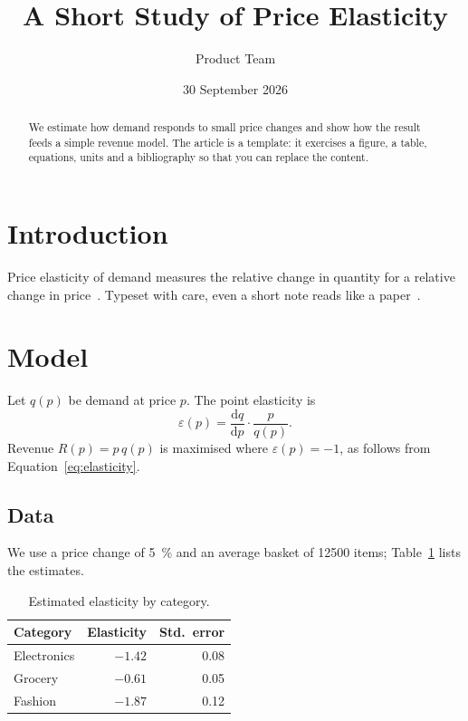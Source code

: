\documentclass[11pt,a4paper]{article}
\title{A Short Study of Price Elasticity}
\author{Product Team}
\date{30 September 2026}
\begin{document}
\maketitle

\begin{abstract}
We estimate how demand responds to small price changes and show how the result
feeds a simple revenue model. The article is a template: it exercises a figure,
a table, equations, units and a bibliography so that you can replace the content.
\end{abstract}

\section{Introduction}
Price elasticity of demand measures the relative change in quantity for a
relative change in price~\citep{varian1992}. Typeset with care, even a short
note reads like a paper~\citep{knuth1984}.

\section{Model}
\label{sec:model}
Let $q(p)$ be demand at price $p$. The point elasticity is
\begin{equation}
  \varepsilon(p) = \frac{\mathrm{d}q}{\mathrm{d}p}\cdot\frac{p}{q(p)}.
  \label{eq:elasticity}
\end{equation}
Revenue $R(p)=p\,q(p)$ is maximised where $\varepsilon(p)=-1$, as follows from
Equation~\ref{eq:elasticity}.

\subsection{Data}
We use a price change of \SI{5}{\percent} and an average basket of \num{12500} items;
Table~\ref{tab:results} lists the estimates.

\begin{table}[htbp]
  \centering
  \caption{Estimated elasticity by category.}
  \label{tab:results}
  \begin{tabular}{lrr}
    \toprule
    Category & Elasticity & Std.\ error \\
    \midrule
    Electronics & $-1.42$ & 0.08 \\
    Grocery     & $-0.61$ & 0.05 \\
    Fashion     & $-1.87$ & 0.12 \\
    \bottomrule
  \end{tabular}
\end{table}
\end{document}
